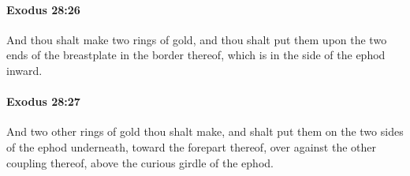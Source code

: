 		\paragraph{Exodus 28:26} %
			\label{EXODUS-28-26}

			And thou shalt make two rings of gold, and thou shalt put them upon the two ends of the breastplate in the border thereof, which is in the side of the ephod inward.


		\paragraph{Exodus 28:27} %
			\label{EXODUS-28-27}

			And two other rings of gold thou shalt make, and shalt put them on the two sides of the ephod underneath, toward the forepart thereof, over against the other coupling thereof, above the curious girdle of the ephod.

